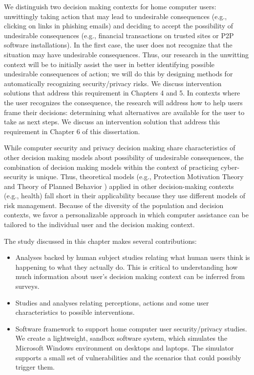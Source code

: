 We distinguish two decision making contexts for home computer users: unwittingly taking action that may lead to undesirable consequences (e.g., clicking on links in phishing emails) and deciding to accept the possibility of undesirable consequences (e.g., financial transactions on trusted sites or P2P software installations). 
In the first case, the user does not recognize that the situation may have undesirable
consequences. 
Thus, our research in the unwitting context will be to initially assist the user in better identifying possible undesirable consequences of action; we will do this by designing methods for automatically recognizing security/privacy risks. 
We discuss intervention solutions that address this requirement in Chapters 4 and 5.
In contexts where the user recognizes the consequence, the research will address how to help users frame their decisions: determining what alternatives are available for the user to take as next steps.
We discuss an intervention solution that address this requirement in Chapter 6 of this dissertation.


While computer security and privacy decision making share characteristics of other decision making models about possibility of undesirable consequences, the combination of decision making models within the context of practicing cyber-security is unique. 
Thus, theoretical models (e.g., Protection Motivation Theory \cite{rogers1997} and Theory of Planned Behavior \cite{ajzen1991}) applied in other decision-making contexts (e.g., health) fall short in their applicability because they use different models of risk management. 
Because of the diversity of the population and decision contexts, we favor a personalizable approach in which computer assistance can be tailored to the individual user and the decision making context.


The study discussed in this chapter makes several contributions:
\begin{itemize}
\item Analyses backed by human subject studies relating what human users think is happening to what they actually do. This is critical to understanding how much information about user's decision making context can be inferred from surveys.
\item Studies and analyses relating perceptions, actions and some user characteristics to possible interventions.
\item Software framework to support home computer user security/privacy studies. We create a lightweight, sandbox software system, which simulates the Microsoft Windows environment on desktops and laptops. The simulator supports a small set of vulnerabilities and the scenarios that could possibly trigger them.
\end{itemize}

